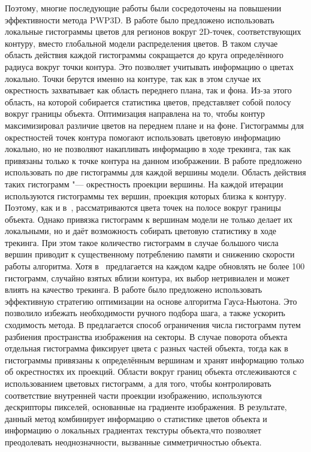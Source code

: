 Поэтому, многие последующие работы были сосредоточены на повышении
эффективности
метода PWP3D.
В работе \cite{Hexner2016} было предложено использовать локальные гистограммы
цветов для регионов вокруг 2D-точек, соответствующих контуру, вместо
глобальной модели распределения цветов.
В таком случае область действия каждой гистограммы сокращается до круга
определённого радиуса вокруг точки контура.
Это позволяет учитывать информацию о цветах локально.
Точки берутся именно на контуре, так как в этом случае их окрестность
захватывает
как область переднего плана, так и фона.
Из-за этого область, на которой собирается статистика цветов, представляет
собой полосу вокруг границы объекта.
Оптимизация направлена на то, чтобы контур максимизировал
различие цветов на переднем плане и на фоне.
Гистограммы для окрестностей точек контура помогают использовать цветовую
информацию локально, но не позволяют накапливать информацию в ходе трекинга,
так как привязаны только к точке контура на данном изображении.
В работе \cite{Tjaden2017} предложено использовать по две гистограммы для
каждой вершины модели.
Область действия таких гистограмм "--- окрестность проекции вершины.
На каждой итерации используются гистограммы тех вершин, проекция которых
близка к контуру.
Поэтому, как и в~\cite{Hexner2016}, рассматриваются цвета точек на полосе
вокруг границы объекта.
Однако привязка гистограмм к вершинам модели не только делает их локальными,
но и даёт возможность собирать цветовую статистику в ходе трекинга.
При этом такое количество гистограмм в случае большого числа вершин приводит к
существенному потреблению памяти и снижению скорости работы алгоритма.
Хотя в~\cite{Tjaden2017} предлагается на каждом кадре обновлять не более 100
гистограмм, случайно взятых вблизи контура, их выбор нетривиален и может влиять
на качество трекинга.
 В работе \cite{Tjaden2018} было предложено использовать
эффективную стратегию оптимизации на основе алгоритма Гауса-Ньютона. Это
позволило избежать необходимости ручного
подбора шага, а также ускорить сходимость метода. 
В \cite{Zhong2018} предлагается способ ограничения числа гистограмм
путем разбиения пространства изображения на секторы. В случае поворота объекта
отдельная гистограмма фиксирует цвета с разных частей
объекта, тогда как в \cite{Tjaden2017} гистограммы привязаны к определённым
вершинам и хранят информацию только об окрестностях их проекций.
Области вокруг границ объекта отслеживаются с использованием цветовых
гистограмм, а для того, чтобы контролировать соответствие внутренней части
проекции изображению, используются дескрипторы пикселей, основанные на
градиенте изображения. В результате, данный метод комбинирует информацию о
статистике цветов объекта и информацию о локальных градиентах текстуры
объекта,что позволяет преодолевать неоднозначности, вызванные симметричностью
объекта.



